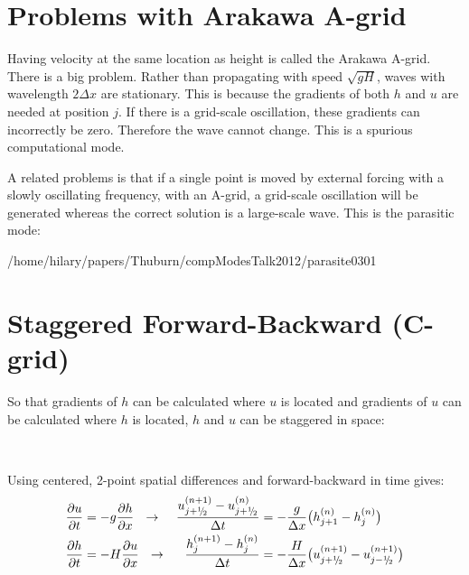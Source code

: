 \clearpage
\section{Problems with Arakawa A-grid}

\begin{minipage}{0.49\linewidth}\raggedright
Having velocity at the same location as height is called the Arakawa A-grid. There is a big problem. Rather than propagating with speed $\sqrt{gH}$, waves with wavelength $2\Delta x$ are stationary. This is because the gradients of both $h$ and $u$ are needed at position $j$. If there is a grid-scale oscillation, these gradients can incorrectly be zero. Therefore the wave cannot change. This is a spurious computational mode.
\vspace{0.6in}

A related problems is that if a single point is moved by external forcing with a slowly oscillating frequency, with an A-grid, a grid-scale oscillation will be generated whereas the correct solution is a large-scale wave. This is the parasitic mode:

\end{minipage}
\hfill
\begin{minipage}{0.49\linewidth}\raggedright
{}
\vspace{0.1in}
{/home/hilary/papers/Thuburn/compModesTalk2012/parasite}{0}{301}
\end{minipage}

\clearpage
\section{Staggered Forward-Backward (C-grid)}

So that gradients of $h$ can be calculated where $u$ is located and gradients of $u$ can be calculated where $h$ is located, $h$ and $u$ can be staggered in space:

\ \\

\optparagraph{\centering}

\vspace{1cm}
Using centered, 2-point spatial differences and forward-backward in time gives:
\begin{align}
\frac{\partial u}{\partial t} &= -g \frac{\partial h}{\partial x}
~~\rightarrow&
\frac{u_{j+\half}^{(n+1)} - u_{j+\half}^{(n)}}{\Delta t} &= -\frac{g}{\Delta x}\bigl(h_{j+1}^{(n)} - h_{j}^{(n)} \bigr)
\label{eqn:SWEuFBC}\\
\frac{\partial h}{\partial t} &= -H \frac{\partial u}{\partial x}
~~\rightarrow&
\frac{h_j^{(n+1)} - h_j^{(n)}}{\Delta t} &= -\frac{H}{\Delta x}\bigl(u_{j+\half}^{(n+1)} - u_{j-\half}^{(n+1)} \bigr) 
\label{eqn:SWEhFBC}
\end{align}

